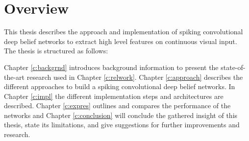 \section{Overview} \label{c:overw}

This thesis describes the approach and implementation of spiking convolutional deep belief networks to extract high level features on continuous visual input. The thesis is structured as follows:

Chapter \ref{c:backgrnd} introduces background information to present the state-of-the-art research used in Chapter \ref{c:relwork}. 
Chapter \ref{c:approach} describes the different approaches to build a spiking convolutional deep belief networks. 
In Chapter \ref{c:impl} the different implementation steps and architectures are described. 
Chapter \ref{c:expres} outlines and compares the performance of the networks and 
Chapter \ref{c:conclusion} will conclude the gathered insight of this thesis, state its limitations, and give suggestions for further improvements and research.  